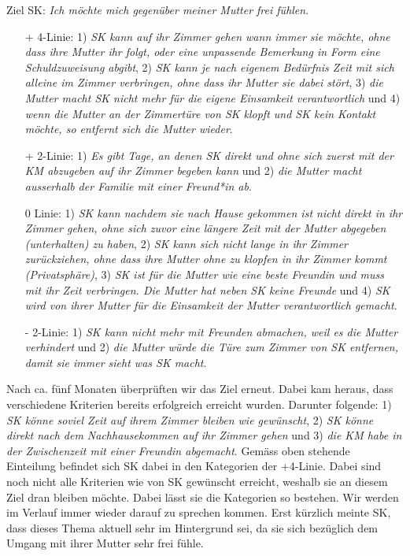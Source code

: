 Ziel SK: \textit{Ich möchte mich gegenüber meiner Mutter frei fühlen}.
\begin{itemize}
   \item[+] 4-Linie: 1) \textit{SK kann auf ihr Zimmer gehen wann immer sie möchte, ohne dass ihre Mutter ihr folgt, oder eine unpassende Bemerkung in Form eine Schuldzuweisung abgibt}, 2) \textit{SK kann je nach eigenem Bedürfnis Zeit mit sich alleine im Zimmer verbringen, ohne dass ihr Mutter sie dabei stört}, 3) \textit{die Mutter macht SK nicht mehr für die eigene Einsamkeit verantwortlich} und 4) \textit{wenn die Mutter an der Zimmertüre von SK klopft und SK kein Kontakt möchte, so entfernt sich die Mutter wieder}.
   \item[+] 2-Linie: 1) \textit{Es gibt Tage, an denen SK direkt und ohne sich zuerst mit der KM abzugeben auf ihr Zimmer begeben kann} und 2) \textit{die Mutter macht ausserhalb der Familie mit einer Freund*in ab}.
  \item[0] Linie: 1) \textit{SK kann nachdem sie nach Hause gekommen ist nicht direkt in ihr Zimmer gehen, ohne sich zuvor eine längere Zeit mit der Mutter abgegeben (unterhalten) zu haben}, 2) \textit{SK kann sich nicht lange in ihr Zimmer zurückziehen, ohne dass ihre Mutter ohne zu klopfen in ihr Zimmer kommt (Privatsphäre)}, 3) \textit{SK ist für die Mutter wie eine beste Freundin und muss mit ihr Zeit verbringen. Die Mutter hat neben SK keine Freunde} und 4) \textit{SK wird von ihrer Mutter für die Einsamkeit der Mutter verantwortlich gemacht}.
 \item[-] 2-Linie: 1) \textit{SK kann nicht mehr mit Freunden abmachen, weil es die Mutter verhindert} und 2) \textit{die Mutter würde die Türe zum Zimmer von SK entfernen, damit sie immer sieht was SK macht}.
\end{itemize}
Nach ca. fünf Monaten überprüften wir das Ziel erneut. Dabei kam heraus, dass verschiedene Kriterien bereits erfolgreich erreicht wurden. Darunter folgende: 1) \textit{SK könne soviel Zeit auf ihrem Zimmer bleiben wie gewünscht}, 2) \textit{SK könne direkt nach dem Nachhausekommen auf ihr Zimmer gehen} und 3) \textit{die KM habe in der Zwischenzeit mit einer Freundin abgemacht}. Gemäss oben stehende Einteilung befindet sich SK dabei in den Kategorien der +4-Linie. Dabei sind noch nicht alle Kriterien wie von SK gewünscht erreicht, weshalb sie an diesem Ziel dran bleiben möchte. Dabei lässt sie die Kategorien so bestehen. Wir werden im Verlauf immer wieder darauf zu sprechen kommen. Erst kürzlich meinte SK, dass dieses Thema aktuell sehr im Hintergrund sei, da sie sich bezüglich dem Umgang mit ihrer Mutter sehr frei fühle. 

